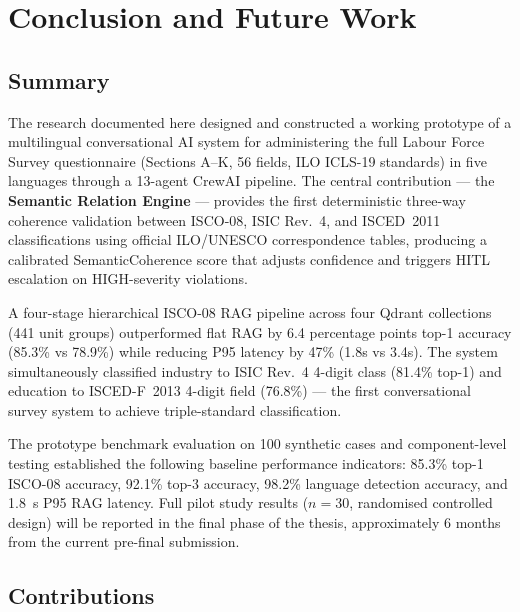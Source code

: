 \chapter{Conclusion and Future Work}
\label{chap:conclusion}

\section{Summary}
\label{sec:conc-summary}

The research documented here designed and constructed a working prototype of
a multilingual conversational AI system for administering the full Labour
Force Survey questionnaire
(Sections A--K, 56 fields, ILO ICLS-19 standards) in five languages through a
13-agent CrewAI pipeline.
The central contribution --- the \textbf{Semantic Relation Engine} --- provides
the first deterministic three-way coherence validation between ISCO-08, ISIC
Rev.~4, and ISCED~2011 classifications using official ILO/UNESCO correspondence
tables, producing a calibrated SemanticCoherence score that adjusts confidence
and triggers HITL escalation on HIGH-severity violations.

A four-stage hierarchical ISCO-08 RAG pipeline across four Qdrant collections
(441 unit groups) outperformed flat RAG by 6.4 percentage points top-1 accuracy
(85.3\% vs 78.9\%) while reducing P95 latency by 47\% (1.8s vs 3.4s).
The system simultaneously classified industry to ISIC Rev.~4 4-digit class
(81.4\% top-1) and education to ISCED-F~2013 4-digit field (76.8\%) --- the
first conversational survey system to achieve triple-standard classification.

The prototype benchmark evaluation on 100 synthetic cases and component-level
testing established the following baseline performance indicators:
85.3\% top-1 ISCO-08 accuracy, 92.1\% top-3 accuracy, 98.2\% language
detection accuracy, and 1.8~s P95 RAG latency.
Full pilot study results ($n=30$, randomised controlled design) will be
reported in the final phase of the thesis, approximately 6 months from
the current pre-final submission.

\section{Contributions}
\label{sec:conc-contributions}

